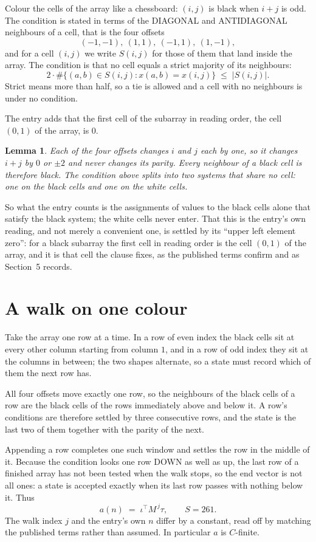 \documentclass[11pt,a4paper]{article}
\theoremstyle{plain}
\newtheorem{lemma}[theorem]{Lemma}
\theoremstyle{definition}
\begin{document}
Colour the cells of the array like a chessboard: $(i,j)$ is black when $i+j$ is odd. The
condition is stated in terms of the DIAGONAL and ANTIDIAGONAL neighbours of a cell, that is the
four offsets
\[
(-1,-1),\ (1,1),\ (-1,1),\ (1,-1),
\]
and for a cell $(i,j)$ we write $S(i,j)$ for those of them that land inside the array. The
condition is that no cell equals a strict majority of its neighbours:
\[
2\cdot\#\{(a,b)\in S(i,j) : x(a,b)=x(i,j)\}\;\le\;|S(i,j)| .
\]
Strict means more than half, so a tie is allowed and a cell with no neighbours is under no condition.

The entry adds that the first cell of the subarray in reading order, the cell $(0,1)$ of the array, is $0$.

\begin{lemma}\label{lem:split}
Each of the four offsets changes $i$ and $j$ each by one, so it changes $i+j$ by $0$ or $\pm2$
and never changes its parity. Every neighbour of a black cell is therefore black. The condition
above splits into two systems that share no cell: one on the black cells and one on the white
cells.
\end{lemma}

So what the entry counts is the assignments of values to the black cells alone that satisfy the
black system; the white cells never enter. That this is the entry's own reading, and not
merely a convenient one, is settled by its ``upper left element zero'': for a black subarray the
first cell in reading order is the cell $(0,1)$ of the array, and it is that cell the
clause fixes, as the published terms confirm and as Section~5 records.

\section{A walk on one colour}

Take the array one row at a time. In a row of even index the black cells sit at every other
column starting from column $1$, and in a row of odd index they sit at the columns in
between; the two shapes alternate, so a state must record which of them the next row has.

All four offsets move exactly one row, so the neighbours of the black cells of a row are the
black cells of the rows immediately above and below it. A row's conditions are therefore settled
by three consecutive rows, and the state is the last two of them together with the parity of the
next.

Appending a row completes one such window and settles the row in the middle of it. Because the
condition looks one row DOWN as well as up, the last row of a finished array has not been tested
when the walk stops, so the end vector is not all ones: a state is accepted exactly when its
last row passes with nothing below it. Thus
\[
a(n)\;=\;\iota^{\!\top}M^{\,j}\tau ,\qquad S=261.
\]
The walk index $j$ and the entry's own $n$ differ by a constant, read off by matching the
published terms rather than assumed. In particular $a$ is $C$-finite.
\end{document}
